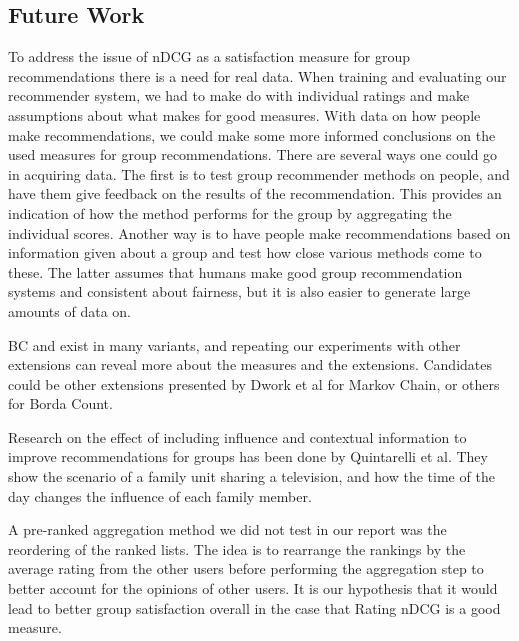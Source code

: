 \subsection{Future Work}\label{sec:futurework}

To address the issue of nDCG as a satisfaction measure for group recommendations there is a need for real data. When training and evaluating our recommender system, we had to make do with individual ratings and make assumptions about what makes for good measures. With data on how people make recommendations, we could make some more informed conclusions on the used measures for group recommendations. There are several ways one could go in acquiring data. The first is to test group recommender methods on people, and have them give feedback on the results of the recommendation. This provides an indication of how the method performs for the group by aggregating the individual scores. Another way is to have people make recommendations based on information given about a group and test how close various methods come to these. The latter assumes that humans make good group recommendation systems and consistent about fairness, but it is also easier to generate large amounts of data on.

BC and \MC exist in many variants, and repeating our experiments with other extensions can reveal more about the measures and the extensions. Candidates could be other extensions presented by Dwork et al\cite{rank:aggregation} for Markov Chain, or others for Borda Count.


Research on the effect of including influence and contextual information to improve recommendations for groups has been done by Quintarelli et al\cite{Quintarelli2016}. They show the scenario of a family unit sharing a television, and how the time of the day changes the influence of each family member.


A pre-ranked aggregation method we did not test in our report was the reordering of the ranked lists.
The idea is to rearrange the rankings by the average rating from the other users before performing the aggregation step to better account for the opinions of other users. It is our hypothesis that it would lead to better group satisfaction overall in the case that Rating nDCG is a good measure.